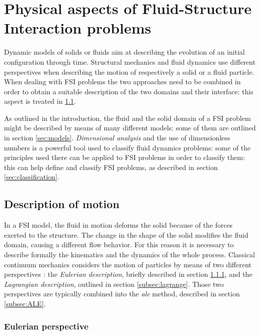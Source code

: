 \chapter{Physical aspects of Fluid-Structure Interaction problems}
\label{cha:physics}


Dynamic models of solids or fluids aim at describing the evolution of an initial configuration through time. Structural mechanics and fluid dynamics use different perspectives when describing the motion of respectively a solid or a fluid particle. When dealing with FSI problems the two approaches need to be combined in order to obtain a suitable description of the two domains and their interface: this aspect is treated in \ref{sec:desc-motion}.

As outlined in the introduction, the fluid and the solid domain of a FSI problem might be described by means of many different models: some of them are outlined in section \ref{sec:models}.  \textit{Dimensional analysis} and the use of dimensionless numbers is a powerful tool used to classify fluid dynamics problems: some of the principles used there can be applied to FSI problems in order to classify them: this can help define and classify FSI problems, as described in section \ref{sec:classification}.

\section{Description of motion}
\label{sec:desc-motion}

In a FSI model, the fluid in motion deforms the solid because of the forces exerted to the structure. The change in the shape of the solid modifies the fluid domain, causing a different flow behavior. For this reason it is necessary to describe formally the kinematics and the dynamics of the whole process. Classical continuum mechanics considers the motion of particles by means of two different perspectives  \cite{batra2006elements}: the \textit{Eulerian description}, briefly described in section \ref{subsec:euler}, and the \textit{Lagrangian description}, outlined in section \ref{subsec:lagrange}. Those two perspectives are typically combined into the \textit{\acrfull{ale}} method, described in section \ref{subsec:ALE}.

\subsection{Eulerian perspective}
\label{subsec:euler}

